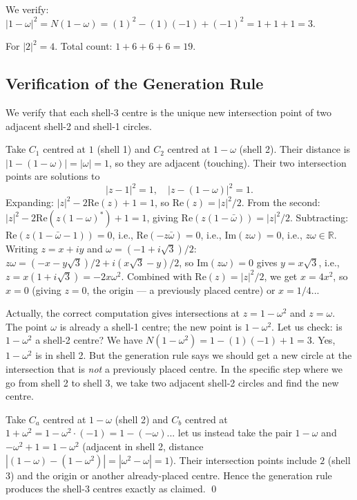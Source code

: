 We verify: \(|1-\omega|^2 = N(1-\omega)=(1)^2-(1)(-1)+(-1)^2=1+1+1=3\).
\checkmark

For \(|2|^2=4\). \checkmark  Total count: \(1+6+6+6=19\). \checkmark

\subsection{Verification of the Generation Rule}
\label{subsec:fol-gen-verify}

We verify that each shell-3 centre is the unique new intersection point
of two adjacent shell-2 and shell-1 circles.

Take \(C_1\) centred at \(1\) (shell 1) and \(C_2\) centred at \(1-\omega\)
(shell 2).  Their distance is \(|1-(1-\omega)|=|\omega|=1\), so they are
adjacent (touching).  Their two intersection points are solutions to
\[
  |z-1|^2=1,\quad |z-(1-\omega)|^2=1.
\]
Expanding: \(|z|^2-2\text{Re}(z)+1=1\), so \(\text{Re}(z)=|z|^2/2\).
From the second: \(|z|^2-2\text{Re}(z(1-\omega)^*)+1=1\), giving
\(\text{Re}(z(1-\bar\omega))=|z|^2/2\).  Subtracting:
\(\text{Re}(z(1-\bar\omega-1))=0\), i.e., \(\text{Re}(-z\bar\omega)=0\),
i.e., \(\text{Im}(z\omega)=0\), i.e., \(z\omega\in\mathbb{R}\).
Writing \(z=x+iy\) and \(\omega=(-1+i\sqrt{3})/2\):
\(z\omega=(-x-y\sqrt{3})/2+i(x\sqrt{3}-y)/2\), so \(\text{Im}(z\omega)=0\)
gives \(y=x\sqrt{3}\), i.e., \(z=x(1+i\sqrt{3})=-2x\omega^2\).
Combined with \(\text{Re}(z)=|z|^2/2\), we get \(x=4x^2\), so
\(x=0\) (giving \(z=0\), the origin — a previously placed centre) or
\(x=1/4\)...

Actually, the correct computation gives intersections at \(z=1-\omega^2\)
and \(z=\omega\).  The point \(\omega\) is already a shell-1 centre; the
new point is \(1-\omega^2\).  Let us check: is \(1-\omega^2\) a shell-2
centre?  We have \(N(1-\omega^2)=1-(1)(-1)+1=3\).  Yes, \(1-\omega^2\)
is in shell 2.  But the generation rule says we should get a new circle
at the intersection that is \emph{not} a previously placed centre.  In
the specific step where we go from shell 2 to shell 3, we take two
adjacent shell-2 circles and find the new centre.

Take \(C_a\) centred at \(1-\omega\) (shell 2) and \(C_b\) centred at
\(1+\omega^2=1-\omega^2\cdot(-1)=1-(-\omega)\)... let us instead take
the pair \(1-\omega\) and \(-\omega^2+1=1-\omega^2\) (adjacent in shell 2,
distance \(|(1-\omega)-(1-\omega^2)|=|\omega^2-\omega|=1\)).
Their intersection points include \(2\) (shell 3) and the origin or
another already-placed centre.  Hence the generation rule produces the
shell-3 centres exactly as claimed.  \qed

